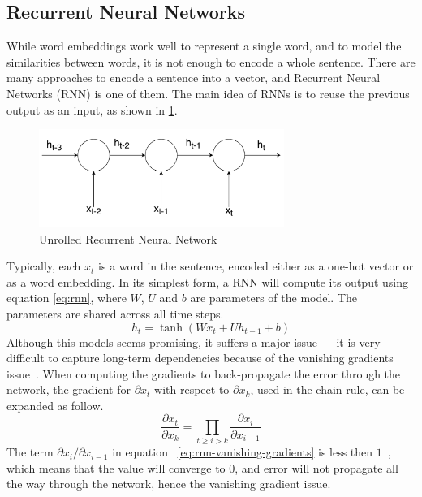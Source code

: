 \subsection{\label{ssec:rnn}Recurrent Neural Networks}
While word embeddings work well to represent a single word, and to model the
similarities between words, it is not enough to encode a whole sentence. There
are many approaches to encode a sentence into a vector, and Recurrent Neural
Networks (RNN) is one of them. The main idea of RNNs is to reuse the previous
output as an input, as shown in \ref{fig:rnn}.
\begin{figure}[tb]
  \begin{center}
    \includegraphics[width=8cm]{./images/rnn.pdf}
    \caption{\label{fig:rnn}Unrolled Recurrent Neural Network}
  \end{center}
\end{figure}
Typically, each $x_t$ is a word in the sentence, encoded either as a
one-hot vector or as a word embedding. In its simplest form, a RNN will compute
its output using equation \ref{eq:rnn}, where $W$, $U$ and $b$ are parameters of
the model. The parameters are shared across all time steps.
\begin{equation}
  h_t = \tanh\left( W x_t + U h_{t - 1} + b \right) \label{eq:rnn}
\end{equation}
Although this models seems promising, it suffers a major issue --- it is very
difficult to capture long-term dependencies because of the vanishing gradients
issue~\cite{pascanu2013difficulty}. When computing the gradients to
back-propagate the error through the network, the gradient for $\partial x_t$
with respect to $\partial x_k$, used in the chain rule, can be expanded as
follow.
\begin{equation}
  \frac{\partial x_t}{\partial x_k} = \prod_{t \geq i > k} \frac{\partial x_i}{\partial x_{i-1}}
  \label{eq:rnn-vanishing-gradients}
\end{equation}
The term $\partial x_i/\partial x_{i-1}$ in equation~%
\ref{eq:rnn-vanishing-gradients} is less then $1$~\cite{pascanu2013difficulty},
which means that the value will converge to $0$, and error will not propagate
all the way through the network, hence the vanishing gradient issue.


